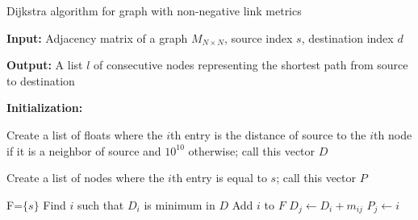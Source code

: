 \documentclass[10pt,letterpaper]{article}
\begin{document}
\begin{algorithm}[h]
\caption{Dijkstra algorithm for graph with non-negative link metrics}
\textbf{Input:}
Adjacency matrix of a graph $M_{N\times N}$, source index $s$, destination index $d$

\textbf{Output:}
A list $l$ of consecutive nodes representing the shortest path from source to destination

\textbf{Initialization:}

Create a list of floats where the $i$th entry is the distance of source to the $i$th node if it is a neighbor of source and $10^{10}$ otherwise; call this vector $D$

Create a list of nodes where the $i$th entry is equal to $s$; call this vector $P$
\begin{algorithmic}
\STATE F=$\{s\}$
\STATE Find $i$ such that $D_i$ is minimum in $D$
\STATE Add $i$ to $F$
\STATE $D_j\longleftarrow D_i+m_{ij}$
\STATE $P_j\longleftarrow i$
\ENDIF
\ENDFOR
\ENDWHILE
\end{algorithmic}
\label{alg:dij}
\end{algorithm}
\newpage
\end{document}
